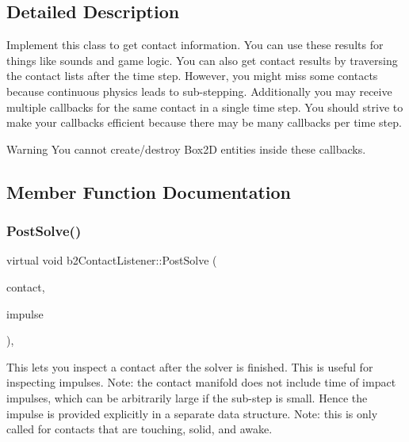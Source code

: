 \subsection{Detailed Description}
Implement this class to get contact information. You can use these results for things like sounds and game logic. You can also get contact results by traversing the contact lists after the time step. However, you might miss some contacts because continuous physics leads to sub-\/stepping. Additionally you may receive multiple callbacks for the same contact in a single time step. You should strive to make your callbacks efficient because there may be many callbacks per time step. \begin{DoxyWarning}{Warning}
You cannot create/destroy Box2D entities inside these callbacks. 
\end{DoxyWarning}


\subsection{Member Function Documentation}
\mbox{\label{classb2ContactListener_acd58ec96f7569b95eec65b8ca3f8013d}} 
\subsubsection{\texorpdfstring{Post\+Solve()}{PostSolve()}}
{\footnotesize\ttfamily virtual void b2\+Contact\+Listener\+::\+Post\+Solve (\begin{DoxyParamCaption}\item[{\mbox{\hyperlink{classb2Contact}{b2\+Contact}} $\ast$}]{contact,  }\item[{const \mbox{\hyperlink{structb2ContactImpulse}{b2\+Contact\+Impulse}} $\ast$}]{impulse }\end{DoxyParamCaption})\hspace{0.3cm}{\ttfamily [inline]}, {\ttfamily [virtual]}}

This lets you inspect a contact after the solver is finished. This is useful for inspecting impulses. Note\+: the contact manifold does not include time of impact impulses, which can be arbitrarily large if the sub-\/step is small. Hence the impulse is provided explicitly in a separate data structure. Note\+: this is only called for contacts that are touching, solid, and awake. \mbox{\label{classb2ContactListener_a416f85eb45a1099053402b15a19a7de0}} 
